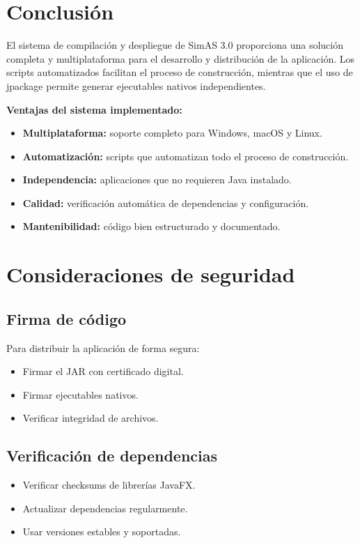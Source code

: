 \section{Conclusión}

El sistema de compilación y despliegue de SimAS 3.0 proporciona una solución completa y multiplataforma para el desarrollo y distribución de la aplicación. Los scripts automatizados facilitan el proceso de construcción, mientras que el uso de jpackage permite generar ejecutables nativos independientes.

\textbf{Ventajas del sistema implementado:}

\begin{itemize}
    \item \textbf{Multiplataforma:} soporte completo para Windows, macOS y Linux.
    \item \textbf{Automatización:} scripts que automatizan todo el proceso de construcción.
    \item \textbf{Independencia:} aplicaciones que no requieren Java instalado.
    \item \textbf{Calidad:} verificación automática de dependencias y configuración.
    \item \textbf{Mantenibilidad:} código bien estructurado y documentado.
\end{itemize}

\section{Consideraciones de seguridad}

\subsection{Firma de código}

Para distribuir la aplicación de forma segura:

\begin{itemize}
    \item Firmar el JAR con certificado digital.
    \item Firmar ejecutables nativos.
    \item Verificar integridad de archivos.
\end{itemize}

\subsection{Verificación de dependencias}

\begin{itemize}
    \item Verificar checksums de librerías JavaFX.
    \item Actualizar dependencias regularmente.
    \item Usar versiones estables y soportadas.
\end{itemize}
